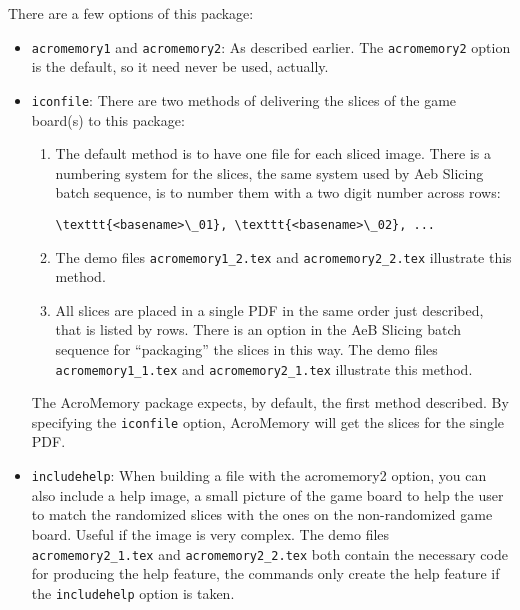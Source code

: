 \documentclass{article}
\begin{document}
There are a few options of this package:
\begin{itemize}
    \item \texttt{acromemory1} and \texttt{acromemory2}: As described earlier. The \texttt{acromemory2} option
    is the default, so it need never be used, actually.
    \item \texttt{iconfile}: There are two methods of delivering the slices of the game board(s) to this package:
    \begin{enumerate}
        \item The default method is to have one file for each sliced
            image. There is a numbering system for the slices, the same system
            used by \textsf{Aeb Slicing} batch sequence, is to number them
            with a two digit number across rows:\smallskip

\begin{Verbatim}[xleftmargin=20pt,fontsize=\fontsize{9}{11}\selectfont]
\texttt{<basename>\_01}, \texttt{<basename>\_02}, ...
\end{Verbatim}

        \item[]The demo files \texttt{acromemory1\_2.tex} and
            \texttt{acromemory2\_2.tex} illustrate this method.

        \item All slices are placed in a single PDF in the same order just
            described, that is listed by rows. There is an option in the
            \textsf{AeB Slicing} batch sequence for ``packaging'' the
            slices in this way. The demo files \texttt{acromemory1\_1.tex}
            and \texttt{acromemory2\_1.tex} illustrate this method.
    \end{enumerate}
    The \textsf{AcroMemory} package expects, by default, the first method
    described. By specifying the \texttt{iconfile} option,
    \textsf{AcroMemory} will get the slices for the single PDF.

    \item \texttt{includehelp}: When building a file with the acromemory2
        option, you can also include a help image, a small picture of the game
        board to help the user to match the randomized slices with the ones on
        the non-randomized game board. Useful if the image is very complex.
        The demo files \texttt{acromemory2\_1.tex} and
        \texttt{acromemory2\_2.tex} both contain the necessary code for
        producing the help feature, the commands only create the help feature
        if the \texttt{includehelp} option is taken.
\end{itemize}
\end{document}
